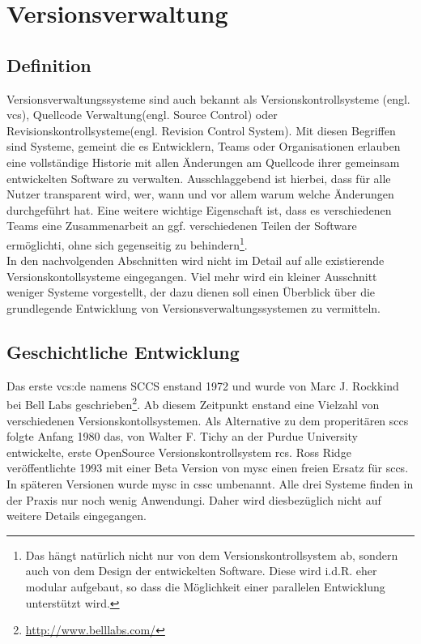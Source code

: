 \chapter{Versionsverwaltung}\label{cha:Versionsverwaltung}
\section{Definition}\label{sec:Definition}
Versionsverwaltungssysteme sind auch bekannt als Versionskontrollsysteme (engl.
\acrlong{vcs}), Quellcode Verwaltung(engl. Source Control) oder
Revisionskontrollsysteme(engl. Revision Control System). Mit diesen Begriffen
sind Systeme, gemeint die es Entwicklern, Teams oder Organisationen erlauben
eine vollständige Historie mit allen Änderungen am Quellcode ihrer gemeinsam
entwickelten Software zu verwalten. Ausschlaggebend ist hierbei, dass für alle
Nutzer transparent wird, wer, wann und vor allem warum welche Änderungen
durchgeführt hat. Eine weitere wichtige Eigenschaft ist, dass es verschiedenen
Teams eine Zusammenarbeit an ggf. verschiedenen Teilen der Software
ermöglichti, ohne sich gegenseitig zu behindern\footnote{\label{dev:1}Das hängt
natürlich nicht nur von dem Versionskontrollsystem ab, sondern auch von dem
Design der entwickelten Software.  Diese wird i.d.R. eher modular aufgebaut, so
dass die Möglichkeit einer parallelen Entwicklung unterstützt
wird.}.\cite[s.~381]{cd}\\

In den nachvolgenden Abschnitten wird nicht im Detail auf alle existierende
Versionskontollsysteme eingegangen. Viel mehr wird ein kleiner Ausschnitt
weniger Systeme vorgestellt, der dazu dienen soll einen Überblick über die
grundlegende Entwicklung von Versionsverwaltungssystemen zu vermitteln.

\section{Geschichtliche Entwicklung}\label{sec:GeschichtlicheEntwicklung}
Das erste \gls{vcs:de} namens SCCS enstand 1972 und wurde von Marc J.  Rockkind
bei Bell Labs
geschrieben\footnote{\url{http://www.belllabs.com/}}\cite[s.~382]{cd}. Ab
diesem Zeitpunkt enstand eine Vielzahl von verschiedenen
Versionskontollsystemen. Als Alternative zu dem properitären \acrshort{sccs}
folgte Anfang 1980 das, von Walter F. Tichy an der Purdue University
entwickelte, erste \acrlong{OpenSource} Versionskontrollsystem
\acrfull{rcs}\cite{paper:rcs,link:rcs}. Ross Ridge veröffentlichte 1993 mit
einer Beta Version von \acrshort{mysc} einen freien Ersatz für \acrshort{sccs}.
In späteren Versionen wurde \acrshort{mysc} in \acrfull{cssc}
umbenannt\cite{link:cssc,link:mysc}. Alle drei Systeme finden in der Praxis nur
noch wenig Anwendungi. Daher wird diesbezüglich nicht auf weitere Details
eingegangen.

